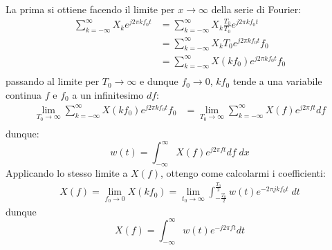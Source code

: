 La prima si ottiene facendo il limite per $ x \to  \infty  $ della serie di Fourier:
\begin{align*}
	\sum_{k = -\infty}^{\infty} X_ke^{j 2 \pi k f_0 t } & =\sum_{k = -\infty}^{\infty} X_k \frac{T_0}{T_0} e^{j 2 \pi k f_0 t }    \\
	                                                    & =\sum_{k = -\infty}^{\infty} X_k T_0 e^{j 2 \pi k f_0 t } f_0            \\
	                                                    & =\sum_{k = -\infty}^{\infty} X\left(kf_0\right) e^{j 2 \pi k f_0 t } f_0 \\
\end{align*}
passando al limite per $ T_0 \to  \infty  $ e dunque $ f_0 \to 0 $, $ kf_0 $ tende a una variabile continua $ f $ e $ f_0 $ a un infinitesimo $ df $:
\begin{align*}
	\lim_{T_0 \to \infty} \sum_{k = -\infty}^{\infty} X\left(kf_0\right) e^{j 2 \pi k f_0 t } f_0 & = \lim_{T_0 \to \infty} \sum_{k = -\infty}^{\infty} X\left(f\right) e^{j 2 \pi f t } df \\
\end{align*}
dunque:
\[
	w\left(t\right) = \int_{-\infty }^{\infty } X\left(f\right) e^{j 2 \pi f t} df \; dx
\]
Applicando lo stesso limite a $ X\left(f\right) $, ottengo come calcolarmi i coefficienti:
\begin{align*}
	X\left(f\right) = \lim_{f_0 \to 0} X\left(kf_0\right)= \lim_{t_0 \to \infty} \int_{-\frac{T_0}{2}}^{\frac{T_0}{2}} w\left(t\right)e^{-2 \pi  j k f_0 t} \; dt
\end{align*}
dunque
\[
	X\left(f\right) = \int_{-\infty }^{\infty } w\left(t\right) e^{-j 2 \pi f t} dt
\]
